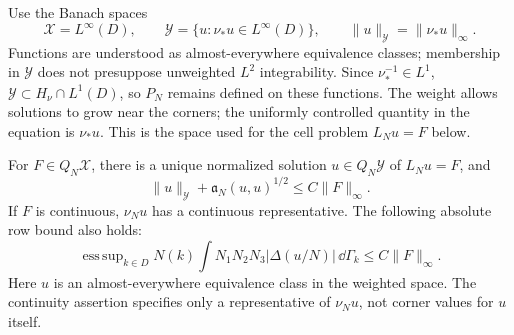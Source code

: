 Use the Banach spaces
\[
 \mathcal X=L^\infty(D),\qquad
 \mathcal Y=\{u:\nu_*u\in L^\infty(D)\},
 \qquad\|u\|_{\mathcal Y}=\|\nu_*u\|_\infty.
\]
Functions are understood as almost-everywhere equivalence classes;
membership in $\mathcal Y$ does not presuppose unweighted $L^2$ integrability.
Since $\nu_*^{-1}\in L^1$,
$\mathcal Y\subset H_\nu\cap L^1(D)$, so $P_N$ remains defined
on these functions. The weight allows solutions to grow near the corners;
the uniformly controlled quantity in the equation is $\nu_*u$.
This is the space used for the cell problem $L_Nu=F$ below.

\begin{proposition}\label{geom:cell}
For $F\in Q_N\mathcal X$, there is a unique normalized solution
$u\in Q_N\mathcal Y$ of $L_Nu=F$, and
\begin{equation}\label{geom:cellbound}
 \|u\|_{\mathcal Y}+\mathfrak a_N(u,u)^{1/2}
   \le C\|F\|_\infty.
\end{equation}
If $F$ is continuous, $\nu_Nu$ has a continuous representative.
The following absolute row bound also holds:
\begin{equation}\label{geom:absoluteformrow}
 \mathop{\mathrm{ess\,sup}}_{k\in D}N(k)\int N_1N_2N_3
             |\Delta(u/N)|\,\dd\Gamma_k\le C\|F\|_\infty.
\end{equation}
Here $u$ is an almost-everywhere equivalence class in the weighted space.
The continuity assertion specifies only a representative of $\nu_Nu$,
not corner values for $u$ itself.
\end{proposition}
